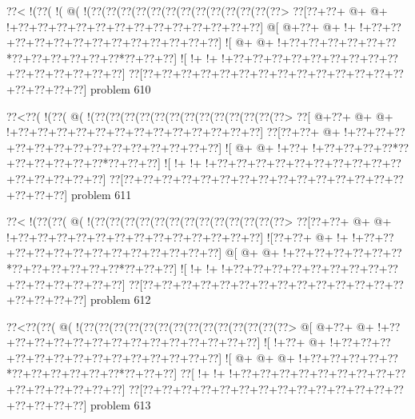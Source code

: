 \vbox{\vbox{\goo
\0??<\- !(\0??(\- !(\- @(\- !(\0??(\0??(\0??(\0??(\0??(\0??(\0??(\0??(\0??(\0??(\0??(\0??(\0??>
\0??[\0??+\0??+\- @+\- @+\- !+\0??+\0??+\0??+\0??+\0??+\0??+\0??+\0??+\0??+\0??+\0??+\0??+\0??]
\- @[\- @+\0??+\- @+\- !+\- !+\0??+\0??+\0??+\0??+\0??+\0??+\0??+\0??+\0??+\0??+\0??+\0??+\0??]
\- ![\- @+\- @+\- !+\0??+\0??+\0??+\0??+\0??+\0??*\0??+\0??+\0??+\0??+\0??+\0??*\0??+\0??+\0??]
\- ![\- !+\- !+\- !+\0??+\0??+\0??+\0??+\0??+\0??+\0??+\0??+\0??+\0??+\0??+\0??+\0??+\0??+\0??]
\0??[\0??+\0??+\0??+\0??+\0??+\0??+\0??+\0??+\0??+\0??+\0??+\0??+\0??+\0??+\0??+\0??+\0??+\0??]
}
\hfil problem 610\hfil\break
}



\vbox{\vbox{\goo
\0??<\0??(\- !(\0??(\- @(\- !(\0??(\0??(\0??(\0??(\0??(\0??(\0??(\0??(\0??(\0??(\0??(\0??(\0??>
\0??[\- @+\0??+\- @+\- @+\- !+\0??+\0??+\0??+\0??+\0??+\0??+\0??+\0??+\0??+\0??+\0??+\0??+\0??]
\0??[\0??+\0??+\- @+\- !+\0??+\0??+\0??+\0??+\0??+\0??+\0??+\0??+\0??+\0??+\0??+\0??+\0??+\0??]
\- ![\- @+\- @+\- !+\0??+\- !+\0??+\0??+\0??+\0??*\0??+\0??+\0??+\0??+\0??+\0??*\0??+\0??+\0??]
\- ![\- !+\- !+\- !+\0??+\0??+\0??+\0??+\0??+\0??+\0??+\0??+\0??+\0??+\0??+\0??+\0??+\0??+\0??]
\0??[\0??+\0??+\0??+\0??+\0??+\0??+\0??+\0??+\0??+\0??+\0??+\0??+\0??+\0??+\0??+\0??+\0??+\0??]
}
\hfil problem 611\hfil\break
}



\vbox{\vbox{\goo
\0??<\- !(\0??(\0??(\- @(\- !(\0??(\0??(\0??(\0??(\0??(\0??(\0??(\0??(\0??(\0??(\0??(\0??(\0??>
\0??[\0??+\0??+\- @+\- @+\- !+\0??+\0??+\0??+\0??+\0??+\0??+\0??+\0??+\0??+\0??+\0??+\0??+\0??]
\- ![\0??+\0??+\- @+\- !+\- !+\0??+\0??+\0??+\0??+\0??+\0??+\0??+\0??+\0??+\0??+\0??+\0??+\0??]
\- @[\- @+\- @+\- !+\0??+\0??+\0??+\0??+\0??+\0??*\0??+\0??+\0??+\0??+\0??+\0??*\0??+\0??+\0??]
\- ![\- !+\- !+\- !+\0??+\0??+\0??+\0??+\0??+\0??+\0??+\0??+\0??+\0??+\0??+\0??+\0??+\0??+\0??]
\0??[\0??+\0??+\0??+\0??+\0??+\0??+\0??+\0??+\0??+\0??+\0??+\0??+\0??+\0??+\0??+\0??+\0??+\0??]
}
\hfil problem 612\hfil\break
}



\vbox{\vbox{\goo
\0??<\0??(\0??(\- @(\- !(\0??(\0??(\0??(\0??(\0??(\0??(\0??(\0??(\0??(\0??(\0??(\0??(\0??(\0??>
\- @[\- @+\0??+\- @+\- !+\0??+\0??+\0??+\0??+\0??+\0??+\0??+\0??+\0??+\0??+\0??+\0??+\0??+\0??]
\- ![\- !+\0??+\- @+\- !+\0??+\0??+\0??+\0??+\0??+\0??+\0??+\0??+\0??+\0??+\0??+\0??+\0??+\0??]
\- ![\- @+\- @+\- @+\- !+\0??+\0??+\0??+\0??+\0??*\0??+\0??+\0??+\0??+\0??+\0??*\0??+\0??+\0??]
\0??[\- !+\- !+\- !+\0??+\0??+\0??+\0??+\0??+\0??+\0??+\0??+\0??+\0??+\0??+\0??+\0??+\0??+\0??]
\0??[\0??+\0??+\0??+\0??+\0??+\0??+\0??+\0??+\0??+\0??+\0??+\0??+\0??+\0??+\0??+\0??+\0??+\0??]
}
\hfil problem 613\hfil\break
}



